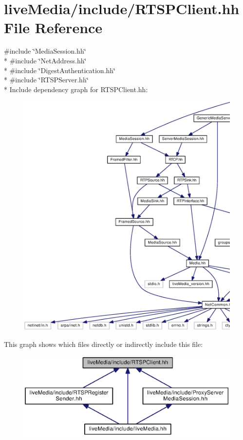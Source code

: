 \section{live\+Media/include/\+R\+T\+S\+P\+Client.hh File Reference}
\label{RTSPClient_8hh}
{\ttfamily \#include \char`\"{}Media\+Session.\+hh\char`\"{}}\\*
{\ttfamily \#include \char`\"{}Net\+Address.\+hh\char`\"{}}\\*
{\ttfamily \#include \char`\"{}Digest\+Authentication.\+hh\char`\"{}}\\*
{\ttfamily \#include \char`\"{}R\+T\+S\+P\+Server.\+hh\char`\"{}}\\*
Include dependency graph for R\+T\+S\+P\+Client.\+hh\+:
\nopagebreak
\begin{figure}[H]
\begin{center}
\leavevmode
\includegraphics[width=350pt]{RTSPClient_8hh__incl}
\end{center}
\end{figure}
This graph shows which files directly or indirectly include this file\+:
\nopagebreak
\begin{figure}[H]
\begin{center}
\leavevmode
\includegraphics[width=350pt]{RTSPClient_8hh__dep__incl}
\end{center}
\end{figure}
